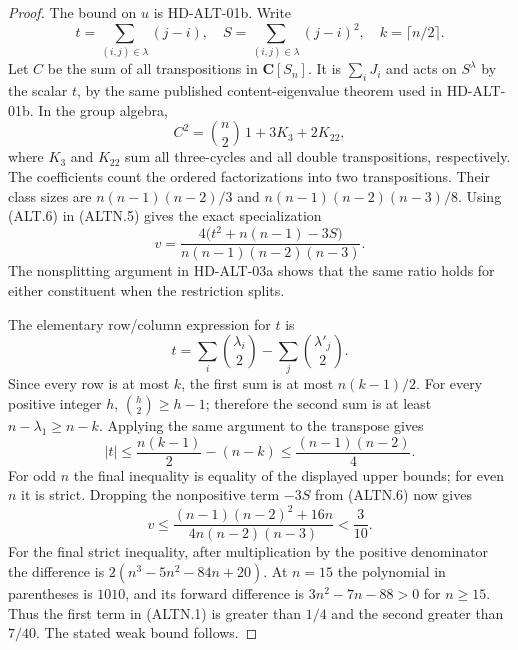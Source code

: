 \begin{proof}
The bound on $u$ is HD-ALT-01b. Write
\[
 t=\sum_{(i,j)\in\lambda}(j-i),\quad
 S=\sum_{(i,j)\in\lambda}(j-i)^2,\quad
 k=\lceil n/2\rceil.
\]
Let $C$ be the sum of all transpositions in $\mathbf C[S_n]$.
It is $\sum_iJ_i$ and acts on $S^\lambda$ by the scalar $t$,
by the same published content-eigenvalue theorem
\cite[Theorem~4.2; author p.~9]{HD:CMN2022} used in HD-ALT-01b.
In the group algebra,
\[
 C^2=\binom n2\,1+3K_3+2K_{22},
                                                               \tag{ALTN.5}
\]
where $K_3$ and $K_{22}$ sum all three-cycles and all double
transpositions, respectively. The coefficients count the ordered
factorizations into two transpositions. Their class sizes are
$n(n-1)(n-2)/3$ and $n(n-1)(n-2)(n-3)/8$.
Using (ALT.6) in (ALTN.5) gives the exact specialization
\[
 v=\frac{4\bigl(t^2+n(n-1)-3S\bigr)}
           {n(n-1)(n-2)(n-3)}.                            \tag{ALTN.6}
\]
The nonsplitting argument in HD-ALT-03a shows that the same ratio
holds for either constituent when the restriction splits.

The elementary row/column expression for $t$ is
\[
 t=\sum_i\binom{\lambda_i}{2}
                   -\sum_j\binom{\lambda'_j}{2}.
\]
Since every row is at most $k$, the first sum is at most
$n(k-1)/2$. For every positive integer $h$, $\binom h2\ge h-1$;
therefore the second sum is at least $n-\lambda_1\ge n-k$.
Applying the same argument to the transpose gives
\[
 |t|\le\frac{n(k-1)}2-(n-k)
                     \le\frac{(n-1)(n-2)}4.              \tag{ALTN.7}
\]
For odd $n$ the final inequality is equality of the displayed
upper bounds; for even $n$ it is strict. Dropping the nonpositive
term $-3S$ from (ALTN.6) now gives
\[
 v\le\frac{(n-1)(n-2)^2+16n}{4n(n-2)(n-3)}<\frac3{10}.
                                                               \tag{ALTN.8}
\]
For the final strict inequality, after multiplication by the
positive denominator the difference is
$2(n^3-5n^2-84n+20)$. At $n=15$ the polynomial in parentheses
is $1010$, and its forward difference is
$3n^2-7n-88>0$ for $n\ge15$.
Thus the first term in (ALTN.1) is greater than $1/4$ and the
second greater than $7/40$. The stated weak bound follows.
\end{proof}

